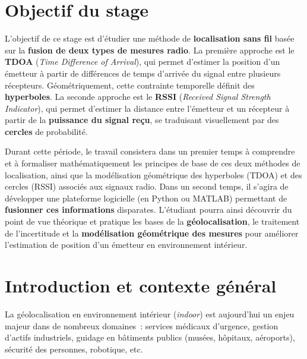 \documentclass[12pt, a4paper]{article}
\begin{document}
\newpage
\tableofcontents
\newpage


\section*{Objectif du stage }
  
L'objectif de ce stage est d'étudier une méthode de \textbf{localisation sans fil} basée sur la \textbf{fusion de deux types de mesures radio}. La première approche est le \textbf{TDOA} (\textit{Time Difference of Arrival}), qui permet d'estimer la position d'un émetteur à partir de différences de temps d'arrivée du signal entre plusieurs récepteurs. Géométriquement, cette contrainte temporelle définit des \textbf{hyperboles}. La seconde approche est le \textbf{RSSI} (\textit{Received Signal Strength Indicator}), qui permet d'estimer la distance entre l'émetteur et un récepteur à partir de la \textbf{puissance du signal reçu}, se traduisant visuellement par des \textbf{cercles} de probabilité.

Durant cette période, le travail consistera dans un premier temps à comprendre et à formaliser mathématiquement les principes de base de ces deux méthodes de localisation, ainsi que la modélisation géométrique des hyperboles (TDOA) et des cercles (RSSI) associés aux signaux radio. Dans un second temps, il s'agira de développer une plateforme logicielle (en Python ou MATLAB) permettant de \textbf{fusionner ces informations} disparates. L'étudiant pourra ainsi découvrir du point de vue théorique et pratique les bases de la \textbf{géolocalisation}, le traitement de l'incertitude et la \textbf{modélisation géométrique des mesures} pour améliorer l'estimation de position d'un émetteur en environnement intérieur.

  
\newpage

\section{Introduction et contexte général}

La géolocalisation en environnement intérieur (\textit{indoor}) est aujourd'hui un
enjeu majeur dans de nombreux domaines~: services médicaux d'urgence, gestion
d'actifs industriels, guidage en bâtiments publics (musées, hôpitaux, aéroports),
sécurité des personnes, robotique, etc.
\end{document}
